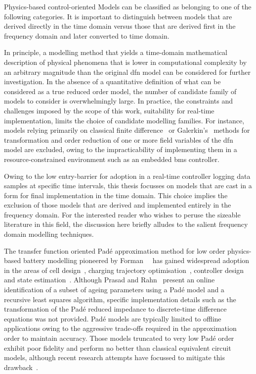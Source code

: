 Physics-based control-oriented Models  can be classified as belonging  to one of
the following categories. It
is important to distinguish between models that are derived directly in the time
domain versus  those that are  derived first in  the frequency domain  and later
converted to time domain.


In  principle,  a  modelling  method  that  yields  a  time-domain  mathematical
description of physical  phenomena that is lower in  computational complexity by
an arbitrary magnitude  than the original \gls{dfn} model can  be considered for
further investigation. In  the absence of a quantitative definition  of what can
be considered as a  true reduced order model, the number  of candidate family of
models to  consider is overwhelmingly  large. In  practice, the  constraints and challenges  imposed by  the scope
of  this  work, \viz{}  suitability  for  real-time implementation,  limits  the
choice of candidate  modelling families. For instance,  models relying primarily
on  classical  finite difference~\cite{Smith2006}  or  Galerkin's~\cite{Dao2012}
methods for transformation and order reduction of one or more field variables of
the \gls{dfn} model are excluded,  owing to the impracticability of implementing
them  in  a  resource-constrained  environment such  as  an  embedded  \gls{bms}
controller.


Owing to  the low entry-barrier for  adoption in a real-time  controller logging
data samples at specific time intervals, this thesis focusses on models that are
cast in a form for final implementation  in the time domain. This choice implies
the exclusion of  those models that are derived and  implemented entirely in the
frequency domain.  For the interested reader  who wishes to peruse  the sizeable
literature in  this field, the  discussion here  briefly alludes to  the salient
frequency domain modelling techniques.


The     transfer     function     oriented    Padé     approximation     method
for    low    order    physics-based     battery    modelling    pioneered    by
Forman~\etal{}~\cite{Forman2011a}    has   gained    widespread   adoption    in
the    areas   of    cell   design~\cite{Marcicki2013},    charging   trajectory
optimisation~\cite{Bashash2010},  controller  design~\cite{Perez2015} and  state
estimation~\cite{Marcicki2013,Moura2012,Bartlett2015}.   Although   Prasad   and
Rahn~\cite{Prasad2013} present  an online identification  of a subset  of ageing
parameters using a Padé model and a recursive least squares algorithm, specific
implementation details such as the transformation of the Padé reduced impedance
to  discrete-time  difference  equations  was not  provided.  Padé  models  are
typically limited  to offline  applications owing  to the  aggressive trade-offs
required in the approximation order to maintain accuracy. Those models truncated
to  very low  Padé  order exhibit  poor  fidelity and  perform  no better  than
classical  equivalent circuit  models,  although recent  research attempts  have
focussed  to  mitigate  this  drawback~\cite{Yuan2017a,Yuan2017}.


